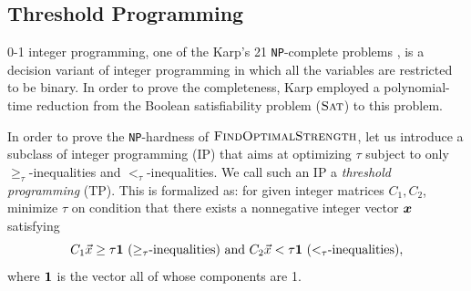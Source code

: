 \documentclass{article}
\theoremstyle{remark}
\theoremstyle{definition}
\newcommand{\findoptstrength}{\ensuremath{\mbox{\sc FindOptimalStrength}}}
\newcommand{\SAT}{\ensuremath{\mbox{\sc Sat}}}
\newcommand{\NP}{{\tt NP}}
\renewcommand{\Vec}[1]{\ensuremath{\mbox{\boldmath$#1$}}}
\begin{document}
	\subsection{Threshold Programming}
	\label{subsec:TP_preliminaries}

0-1 integer programming, one of the Karp's 21 \NP-complete problems \cite{Karp1972}, is a decision variant of integer programming in which all the variables are restricted to be binary. 
In order to prove the completeness, Karp employed a polynomial-time reduction from the Boolean satisfiability problem ($\SAT$) to this problem. 

In order to prove the \NP-hardness of $\findoptstrength$, let us introduce a subclass of integer programming (IP) that aims at optimizing $\tau$ subject to only $\ge_\tau$-inequalities and $<_\tau$-inequalities. 
We call such an IP a {\it threshold programming} (TP). 
This is formalized as: for given integer matrices $C_1, C_2$, minimize $\tau$ on condition that there exists a nonnegative integer vector $\Vec{x}$ satisfying %
\[
	\mbox{$C_1 \vec{x} \ge \tau \Vec{1}$ ($\ge_\tau$-inequalities) and $C_2 \vec{x} < \tau \Vec{1}$ ($<_\tau$-inequalities)}, 
\]
where $\Vec{1}$ is the vector all of whose components are 1. 
\end{document}

